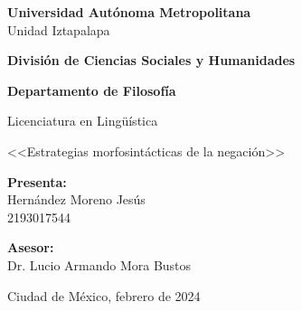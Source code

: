 \begin{titlepage}
\begin{center}

{\LARGE \textbf{Universidad Autónoma Metropolitana}} \\
{\Large Unidad Iztapalapa} \vspace{3cm}

{\Large \textbf{División de Ciencias Sociales y Humanidades}} \vspace{2cm}

{\large \textbf{Departamento de Filosofía}}

{\Large Licenciatura en Lingüística} \vspace{2cm}

{\Large <<Estrategias morfosintácticas de la negación>>} \vspace{2cm}


{\Large \textbf{Presenta:}} \\
{\Large Hernández Moreno Jesús \\
2193017544} \vspace{2cm}

{\Large \textbf{Asesor:}} \\
{\Large Dr. Lucio Armando Mora Bustos} \vfill
 
{\Large Ciudad de México, febrero de 2024}

\end{center}   
\end{titlepage}